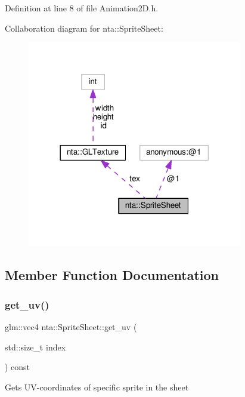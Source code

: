 Definition at line 8 of file Animation2\+D.\+h.



Collaboration diagram for nta\+:\+:Sprite\+Sheet\+:\nopagebreak
\begin{figure}[H]
\begin{center}
\leavevmode
\includegraphics[width=266pt]{d2/d89/structnta_1_1SpriteSheet__coll__graph}
\end{center}
\end{figure}


\subsection{Member Function Documentation}
\mbox{\label{structnta_1_1SpriteSheet_a618bc48e6978a19ad9eb56dda3307f5a}} 
\subsubsection{\texorpdfstring{get\+\_\+uv()}{get\_uv()}}
{\footnotesize\ttfamily glm\+::vec4 nta\+::\+Sprite\+Sheet\+::get\+\_\+uv (\begin{DoxyParamCaption}\item[{std\+::size\+\_\+t}]{index }\end{DoxyParamCaption}) const\hspace{0.3cm}{\ttfamily [inline]}}

Gets U\+V-\/coordinates of specific sprite in the sheet


